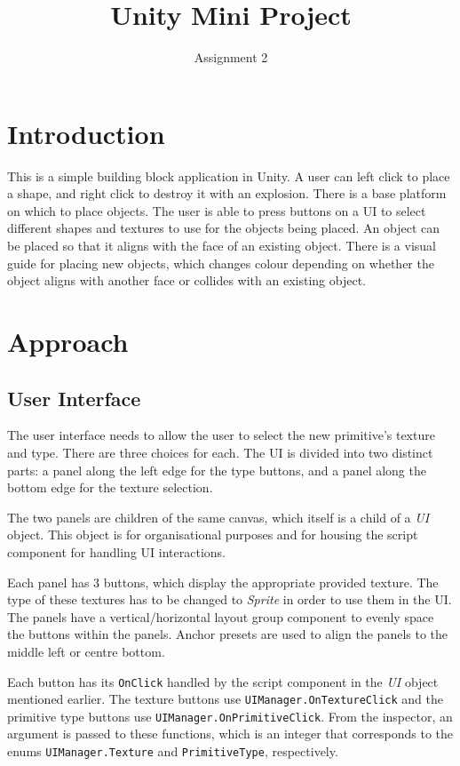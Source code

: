 \documentclass[a4paper, 12pt]{scrartcl}
\title{Unity Mini Project}
\subtitle{Assignment 2}
\date{}
\author{}
\begin{document}
\maketitle

\section{Introduction}
This is a simple building block application in Unity. A user can left click to place a shape, and right click to destroy it with an explosion. There is a base platform on which to place objects. The user is able to press buttons on a UI to select different shapes and textures to use for the objects being placed. An object can be placed so that it aligns with the face of an existing object. There is a visual guide for placing new objects, which changes colour depending on whether the object aligns with another face or collides with an existing object.

\section{Approach}
\subsection{User Interface}
The user interface needs to allow the user to select the new primitive's texture and type. There are three choices for each. The UI is divided into two distinct parts: a panel along the left edge for the type buttons, and a panel along the bottom edge for the texture selection.

The two panels are children of the same canvas, which itself is a child of a \textit{UI} object. This object is for organisational purposes and for housing the script component for handling UI interactions.

Each panel has 3 buttons, which display the appropriate provided texture. The type of these textures has to be changed to \textit{Sprite} in order to use them in the UI. The panels have a vertical/horizontal layout group component to evenly space the buttons within the panels. Anchor presets are used to align the panels to the middle left or centre bottom.

Each button has its \texttt{OnClick} handled by the script component in the \textit{UI} object mentioned earlier. The texture buttons use \texttt{UIManager.OnTextureClick} and the primitive type buttons use \texttt{UIManager.OnPrimitiveClick}. From the inspector, an argument is passed to these functions, which is an integer that corresponds to the enums \texttt{UIManager.Texture} and \texttt{PrimitiveType}, respectively.
\end{document}
